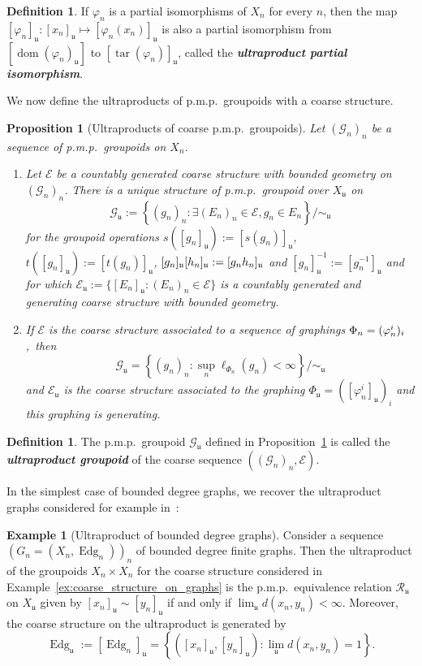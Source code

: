\documentclass[10pt]{amsart}
\newtheorem{prop}[cdrthm]{Proposition}
\theoremstyle{definition}
\newtheorem{defi}[cdrthm]{Definition}
\newtheorem{exam}[cdrthm]{Example}
\newcommand{\defin}[1]{\textbf{\emph{#1}}}
\newcommand{\coarse}{\mathcal{E}}
\newcommand{\RR}{\mathcal{R}}
\newcommand{\cg}{\mathcal{G}}
\DeclareMathOperator{\dom}{dom}
\DeclareMathOperator{\tar}{tar}
\DeclareMathOperator{\Edg}{Edg}
\newcommand{\ul}{\mathfrak{u}}
\newcommand{\ph}{\varphi}
\newcommand{\pmp}{p.m.p.\ }
\let\oldexists\exists
\renewcommand*{\exists}{\mathrel{\oldexists}}
\begin{document}
\begin{defi}\label{dfn:part_iso}
If $\ph_n$ is a partial isomorphisms of $X_n$ for every $n$, then the map $[\ph_n]_\ul:[x_n]_\ul\mapsto [\ph_n(x_n)]_\ul$ is also a partial isomorphism from $[\dom(\ph_n)_\ul]$ to $[\tar(\ph_n)]_\ul$, called the
\defin{ultraproduct partial isomorphism}.
\end{defi}

We now define the ultraproducts of \pmp groupoids with a coarse structure.


\begin{prop}[Ultraproducts of coarse \pmp groupoids]\label{prop:ultraproduct_of_coarse_structures}
Let $(\cg_n)_n$ be a sequence of \pmp groupoids on $X_n$.
\begin{enumerate}
\item \label{prop2.31.1} Let $\coarse$ be a countably generated coarse structure with bounded geometry on $(\cg_n)_n$. There is a unique structure of \pmp groupoid over $X_{\ul}$ on
\[
\cg_\ul := \left\{(g_n)_n : \exists (E_n)_n \in \coarse, g_n \in E_n\right\}/\sim_\ul
\]
for the groupoid operations $s([g_n]_\ul) := [s(g_n)]_\ul$, $t([g_n]_\ul) := [t(g_n)]_\ul$, $[g_n]_\ul[h_n]_\ul\linebreak:= [g_n h_n]_\ul$ and $[g_n]_\ul^{-1} := [g_n^{-1}]_\ul$ and for which $\coarse_\ul := \{[E_n]_\ul: (E_n)_n \in \coarse\}$ is a countably generated and generating coarse structure with bounded geometry.

\item \label{prop2.31.2}If $\coarse$ is the coarse structure associated to a sequence of graphings $\Phi_n\linebreak=(\ph_n^i)_i$,~then
\[
\cg_\ul = \left\{(g_n)_n : \sup_n \ell_{\Phi_n}(g_n)<\infty\right\}/\sim_\ul
\]
and $\coarse_\ul$ is the coarse structure associated to the graphing $\Phi_\ul=([\ph_n^i]_\ul)_i$ and this graphing is generating.
\end{enumerate}
\end{prop}


\begin{defi}
The \pmp groupoid $\cg_\ul$ defined in Proposition~\ref{prop:ultraproduct_of_coarse_structures} is called the
\defin{ultraproduct groupoid} of the coarse sequence $((\cg_n)_n, \coarse)$.
\end{defi}

In the simplest case of bounded degree graphs, we recover the ultraproduct graphs considered for example in~\cite[Section~9]{HatLovSze}:
\begin{exam}[Ultraproduct of bounded degree graphs]\label{ex:ultraproduct_of_graphs}
Consider a sequence $(G_n=(X_n,\Edg_n))_n$ of bounded degree finite graphs. Then the ultraproduct of the groupoids $X_n \times X_n$ for the coarse structure considered in Example~\ref{ex:coarse_structure_on_graphs} is the \pmp equivalence relation $\RR_\ul$ on $X_\ul$ given by $[x_n]_\ul \sim [y_n]_\ul$ if and only if $\lim_\ul d(x_n,y_n)<\infty$. Moreover, the coarse structure on the ultraproduct is generated by
\[
\Edg_\ul := \left[\Edg_n\right]_\ul = \left\{\left([x_n]_\ul,[y_n]_\ul\right) : \lim_\ul d(x_n,y_n)=1\right\}.
\]
\end{exam}
\end{document}

